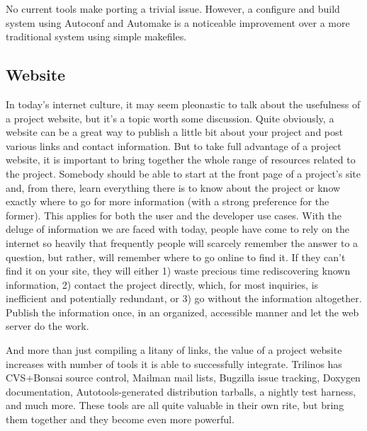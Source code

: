 \documentclass[12pt,relax]{article}
\begin{document}
No current tools make porting a trivial issue.  However, a 
configure and build system using Autoconf and Automake is a 
noticeable improvement over a more traditional system using simple makefiles.

\subsection{Website}

In today's internet culture, it may seem pleonastic to talk about the
usefulness of a project website, but it's a topic worth some discussion.
Quite obviously, a website can be a great way to publish a little bit about
your project and post various links and contact information.  But to take full
advantage of a project website, it is important to bring together the whole
range of resources related to the project.  Somebody should be able to start at
the front page of a project's site and, from there, learn everything there is
to know about the project or know exactly where to go for more information
(with a strong preference for the former).  This applies for both the user
and the developer use cases.  With the deluge of information we are faced with
today, people have come to rely on the internet so heavily that frequently
people will scarcely remember the answer to a question, but rather, will
remember where to go online to find it.  If they can't find it on your site,
they will either 1) waste precious time rediscovering known information, 2)
contact the project directly, which, for most inquiries, is inefficient and
potentially redundant, or 3) go without the information altogether.  Publish
the information once, in an organized, accessible manner and let the web server
do the work.

And more than just compiling a litany of links, the value of a project website
increases with number of tools it is able to successfully integrate.  Trilinos
has CVS+Bonsai source control, Mailman mail lists, Bugzilla issue tracking,
Doxygen documentation, Autotools-generated distribution tarballs, a nightly
test harness, and much more.  These tools are all quite valuable in their own
rite, but bring them together and they become even more powerful.
\end{document}
